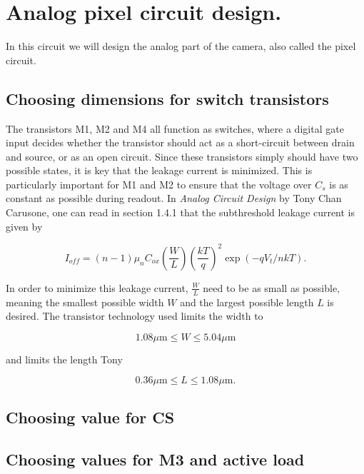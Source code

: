 \section{Analog pixel circuit design.}

In this circuit we will design the analog part of the camera, also called the pixel circuit.

\subsection{Choosing dimensions for switch transistors}
The transistors M1, M2 and M4 all function as switches, where a digital gate input decides whether the transistor should act as a short-circuit between drain and source, or as an open circuit. Since these transistors simply should have two possible states, it is key that the leakage current is minimized. This is particularly important for M1 and M2 to ensure that the voltage over $C_s$ is as constant as possible during readout. In \emph{Analog Circuit Design} by Tony Chan Carusone, one can read in section 1.4.1 that the subthreshold leakage current is given by

\begin{equation}
    \label{eq:leakage}
    I_{off} = (n-1) \mu_n C_{ox} \left( \frac{W}{L} \right) \left( \frac{kT}{q} \right)^2 \exp{(-qV_t / nkT)}.
\end{equation}

In order to minimize this leakage current, $\frac{W}{L}$ need to be as small as possible, meaning the smallest possible width $W$ and the largest possible length $L$ is desired. The transistor technology used limits the width to 

\begin{equation}
    \label{limitsW}
    1.08 \mu\textrm{m} \leq W \leq 5.04 \mu\textrm{m}
\end{equation}

and limits the length Tony

\begin{equation}
    \label{limitsL}
    0.36 \mu\textrm{m} \leq L \leq 1.08 \mu\textrm{m}.
\end{equation}

\subsection{Choosing value for CS}

\subsection{Choosing values for M3 and active load}
